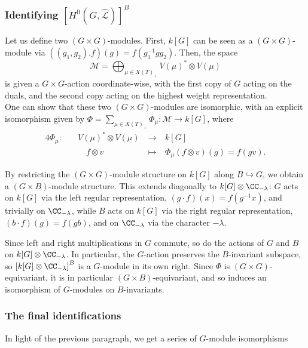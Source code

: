 \subsubsection[Identifying]{Identifying ${\left[H^{0}\left(G, \hat{\mathcal{L}}\right)\right]}^B$}
Let us define two $(G \times G)$-modules. First, $k[G]$ can be seen as a $(G \times G)$-module via $((g_1, g_2).f)(g) = f(g_1^{-1} g g_2)$. Then, the space
\[ \mathcal{M} = \bigoplus_{\mu \in {X(T)}_+} {V(\mu)}^* \otimes V(\mu) \]
is given a $G \times G$-action coordinate-wise, with the first copy of $G$ acting on the duals, and the second copy acting on the highest weight representation. \\
One can show that these two $(G \times G)$-modules are isomorphic, with an explicit isomorphism given by $\Phi = \sum_{\mu \in {X(T)}_+} \Phi_\mu : \mathcal{M} \to k[G]$, where
\begin{alignat*}{4}
    \Phi_\mu: \quad & {V(\mu)}^* \otimes V(\mu) &\ \to\ & k[G]\\
           & \quad f \otimes v  &\ \mapsto\ & \Phi_\mu\left(f \otimes v \right)(g) = f(gv).
\end{alignat*}

By restricting the $(G \times G)$-module structure on $k[G]$ along 
$B \hookrightarrow G$, we obtain a $(G \times B)$-module structure. 
This extends diagonally to $k[G] \otimes \CC_{-\lambda}$: $G$ acts on 
$k[G]$ via the left regular representation, $(g \cdot f)(x) = f(g^{-1}x)$, 
and trivially on $\CC_{-\lambda}$, while $B$ acts on $k[G]$ via the right 
regular representation, $(b \cdot f)(g) = f(gb)$, and on $\CC_{-\lambda}$ 
via the character $-\lambda$.

Since left and right multiplications in $G$ commute, so do the 
actions of $G$ and $B$ on $k[G] \otimes \CC_{-\lambda}$. In particular, 
the $G$-action preserves the $B$-invariant subspace, so 
${\left[k[G] \otimes \CC_{-\lambda}\right]}^B$ is a $G$-module in its own 
right. Since $\Phi$ is $(G \times G)$-equivariant, it is in particular 
$(G \times B)$-equivariant, and so induces an isomorphism of $G$-modules 
on $B$-invariants.

\subsubsection{The final identifications}
In light of the previous paragraph, we get a series of $G$-module isomorphisms

